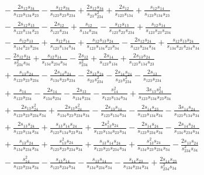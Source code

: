 \begin{align}
  & \quad - \frac{2s_{12}s_{34}}{s_{123}s_{134}s_{23}} - \frac{s_{12}s_{34}}{s_{123}s_{23}s_{234}} + \frac{2s_{12}s_{34}}{s_{23}s_{234}^2} + \frac{2s_{12}}{s_{123}s_{134}} + \frac{s_{12}s_{14}}{s_{123}s_{134}s_{23}} \nonumber \\
  & \quad - \frac{2s_{12}s_{13}}{s_{123}s_{134}s_{23}} - \frac{2s_{12}}{s_{123}s_{234}} + \frac{s_{12}}{s_{134}s_{234}} - \frac{s_{12}s_{13}}{s_{123}s_{23}s_{234}} + \frac{s_{12}s_{14}}{s_{123}s_{23}s_{234}} \nonumber \\
  & \quad - \frac{s_{12}s_{13}}{s_{134}s_{23}s_{234}} + \frac{s_{12}s_{14}}{s_{123}s_{134}s_{34}} + \frac{s_{12}s_{13}s_{24}}{s_{123}s_{134}s_{23}s_{34}} - \frac{2s_{12}s_{24}}{s_{123}s_{234}s_{34}} + \frac{s_{12}s_{13}s_{24}}{s_{134}s_{23}s_{234}s_{34}} \nonumber \\
  & \quad - \frac{2s_{12}s_{24}}{s_{234}^2s_{34}} + \frac{s_{12}s_{14}}{s_{134}s_{234}s_{34}} - \frac{2s_{12}}{s_{234}^2} + \frac{2s_{14}}{s_{123}s_{134}} + \frac{2s_{13}s_{24}}{s_{123}s_{134}s_{23}} \nonumber \\
  & \quad + \frac{s_{13}s_{24}}{s_{123}s_{23}s_{234}} - \frac{2s_{14}s_{24}}{s_{134}s_{23}s_{234}} - \frac{2s_{13}s_{24}}{s_{23}s_{234}^2} - \frac{2s_{14}s_{24}}{s_{23}s_{234}^2} - \frac{2s_{13}}{s_{123}s_{234}} \nonumber \\
  & \quad + \frac{s_{14}}{s_{123}s_{234}} - \frac{2s_{14}}{s_{134}s_{234}} - \frac{2s_{13}}{s_{134}s_{234}} - \frac{s_{14}^2}{s_{123}s_{134}s_{34}} + \frac{3s_{13}s_{24}^2}{s_{123}s_{134}s_{23}s_{34}} \nonumber \\
  & \quad + \frac{2s_{13}s_{24}^2}{s_{123}s_{23}s_{234}s_{34}} + \frac{2s_{13}s_{24}^2}{s_{134}s_{23}s_{234}s_{34}} - \frac{2s_{13}s_{14}}{s_{123}s_{134}s_{34}} - \frac{2s_{14}s_{23}}{s_{123}s_{134}s_{34}} - \frac{3s_{14}s_{24}}{s_{123}s_{134}s_{34}} \nonumber \\
  & \quad + \frac{2s_{13}s_{24}}{s_{123}s_{134}s_{34}} + \frac{s_{13}s_{14}s_{24}}{s_{123}s_{134}s_{23}s_{34}} + \frac{2s_{13}^2s_{24}}{s_{123}s_{134}s_{23}s_{34}} - \frac{2s_{14}s_{24}}{s_{123}s_{234}s_{34}} - \frac{2s_{14}s_{24}}{s_{134}s_{234}s_{34}} \nonumber \\
  & \quad + \frac{s_{13}s_{24}}{s_{134}s_{234}s_{34}} + \frac{s_{13}^2s_{24}}{s_{123}s_{23}s_{234}s_{34}} + \frac{s_{13}s_{14}s_{24}}{s_{123}s_{23}s_{234}s_{34}} + \frac{s_{13}^2s_{24}}{s_{134}s_{23}s_{234}s_{34}} - \frac{2s_{13}s_{24}}{s_{234}^2s_{34}} \nonumber \\
  & \quad - \frac{s_{14}^2}{s_{123}s_{234}s_{34}} - \frac{s_{13}s_{14}}{s_{123}s_{234}s_{34}} - \frac{s_{13}s_{14}}{s_{134}s_{234}s_{34}} - \frac{s_{14}s_{23}}{s_{134}s_{234}s_{34}} + \frac{2s_{14}s_{23}}{s_{234}^2s_{34}} \nonumber \\

\end{align}
